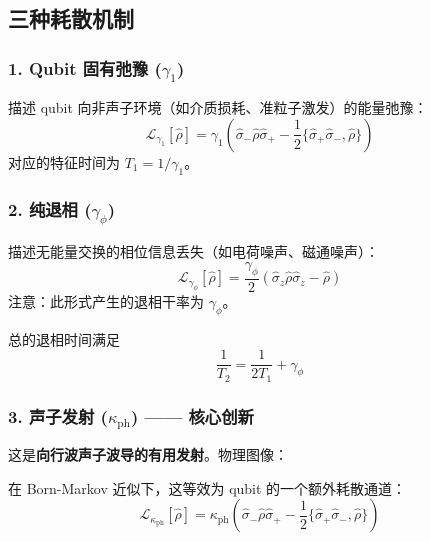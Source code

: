 \documentclass[12pt,a4paper]{article}
\theoremstyle{definition}
\begin{document}
\subsection{三种耗散机制}

\subsubsection{1. Qubit 固有弛豫 ($\gamma_1$)}

描述 qubit 向非声子环境（如介质损耗、准粒子激发）的能量弛豫：
\begin{equation}
    \mathcal{L}_{\gamma_1}[\hat{\rho}] = \gamma_1\left(\hat{\sigma}_-\hat{\rho}\hat{\sigma}_+ - \frac{1}{2}\{\hat{\sigma}_+\hat{\sigma}_-, \hat{\rho}\}\right)
    \label{eq:t1_dissipation}
\end{equation}
对应的特征时间为 $T_1 = 1/\gamma_1$。

\subsubsection{2. 纯退相 ($\gamma_\phi$)}

描述无能量交换的相位信息丢失（如电荷噪声、磁通噪声）：
\begin{equation}
    \mathcal{L}_{\gamma_\phi}[\hat{\rho}] = \frac{\gamma_\phi}{2}\left(\hat{\sigma}_z\hat{\rho}\hat{\sigma}_z - \hat{\rho}\right)
    \label{eq:pure_dephasing}
\end{equation}
注意：此形式产生的退相干率为 $\gamma_\phi$。

总的退相时间满足
\begin{equation}
    \frac{1}{T_2} = \frac{1}{2T_1} + \gamma_\phi
    \label{eq:t2_relation}
\end{equation}

\subsubsection{3. 声子发射 ($\kappa_{\text{ph}}$) —— 核心创新}

这是\textbf{向行波声子波导的有用发射}。物理图像：
\begin{center}
\end{center}

在 Born-Markov 近似下，这等效为 qubit 的一个额外耗散通道：
\begin{equation}
    \boxed{\mathcal{L}_{\kappa_{\text{ph}}}[\hat{\rho}] = \kappa_{\text{ph}}\left(\hat{\sigma}_-\hat{\rho}\hat{\sigma}_+ - \frac{1}{2}\{\hat{\sigma}_+\hat{\sigma}_-, \hat{\rho}\}\right)}
    \label{eq:phonon_emission}
\end{equation}
\end{document}
